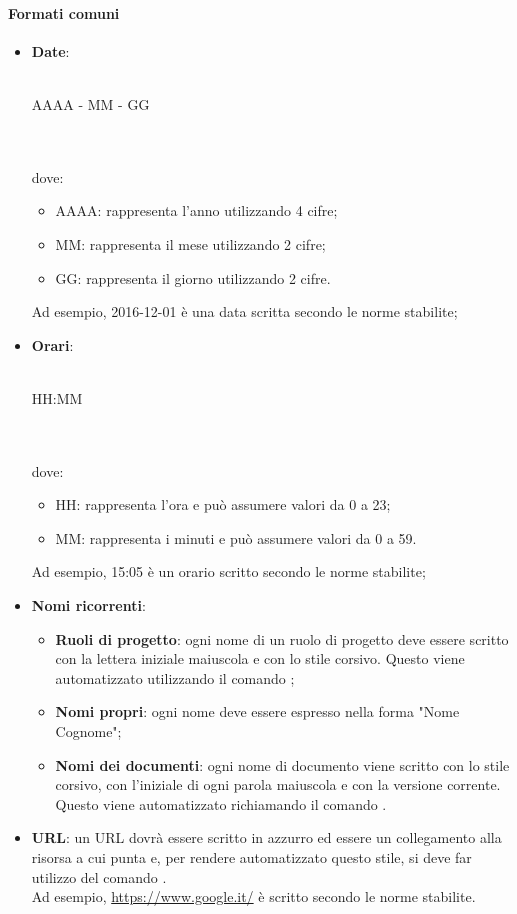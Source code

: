  \paragraph{Formati comuni}
\begin{itemize}
	\item \textbf{Date}:\\ \\ \centerline{AAAA - MM - GG} \\ \\
	dove:
	\begin{itemize}
		\item AAAA: rappresenta l'anno utilizzando 4 cifre;
		\item MM: rappresenta il mese utilizzando 2 cifre;
		\item GG: rappresenta il giorno utilizzando 2 cifre.
	\end{itemize}
	Ad esempio, 2016-12-01 è una data scritta secondo le norme stabilite;
	\item \textbf{Orari}:\\ \\ \centerline{HH:MM} \\ \\dove:
	\begin{itemize}
		\item HH: rappresenta l'ora e può assumere valori da 0 a 23;
		\item MM: rappresenta i minuti e può assumere valori da 0 a 59.
	\end{itemize}
	Ad esempio, 15:05 è un orario scritto secondo le norme stabilite;
	\item \textbf{Nomi ricorrenti}:
	\begin{itemize}
		\item \textbf{Ruoli di progetto}: ogni nome di un ruolo di progetto deve essere scritto con la lettera iniziale maiuscola e con lo stile corsivo. Questo viene automatizzato utilizzando il comando ;
		\item \textbf{Nomi propri}: ogni nome deve essere espresso nella forma "Nome Cognome";
		\item \textbf{Nomi dei documenti}: ogni nome di documento viene scritto con lo stile corsivo, con l'iniziale di ogni parola maiuscola e con la versione corrente. Questo viene automatizzato richiamando il comando .
	\end{itemize}
	\item \textbf{URL}: un URL dovrà essere scritto in azzurro ed essere un collegamento alla risorsa a cui punta e, per rendere automatizzato questo stile, si deve far utilizzo del comando .\\
	Ad esempio, \url{https://www.google.it/} è scritto secondo le norme stabilite.
\end{itemize}
